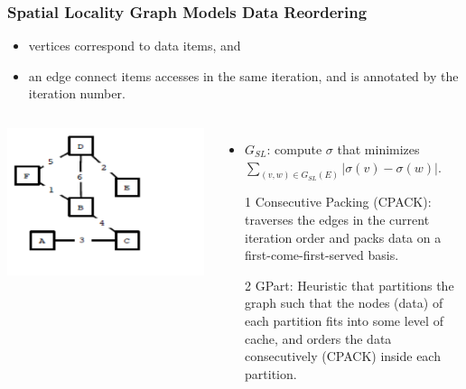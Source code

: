 \documentclass{beamer}
\newcommand{\emp}[1]{\textcolor{DikuRed}{ #1}}
\begin{document}
\begin{frame}[fragile,t]
  \frametitle{Spatial Locality Graph Models Data Reordering}

\begin{itemize}
    \item vertices correspond to data items, and 
    \item an edge connect items accesses in the same 
            iteration, and is annotated by the iteration
            number.
\end  {itemize}

\begin{columns}
\includegraphics[width=44ex]{Figures/SpatLocGraph}
\begin{itemize}
\item $G_{SL}$: compute $\sigma$ that minimizes
        $\sum_{(v,w)\in G_{SL}(E)} |\sigma(v)-\sigma(w)|$.
\item[1] \emp{Consecutive Packing (CPACK)}: traverses
            the edges in the current iteration order
            and packs data on a first-come-first-served basis.\smallskip


\item[2] \emp{GPart}: Heuristic that partitions the 
            graph such that the nodes (data) of each partition 
            fits into some level
            of cache, and orders the data consecutively (CPACK) inside
            each partition.
\end{itemize}
\end{columns}

 
\end{frame}
\end{document}

